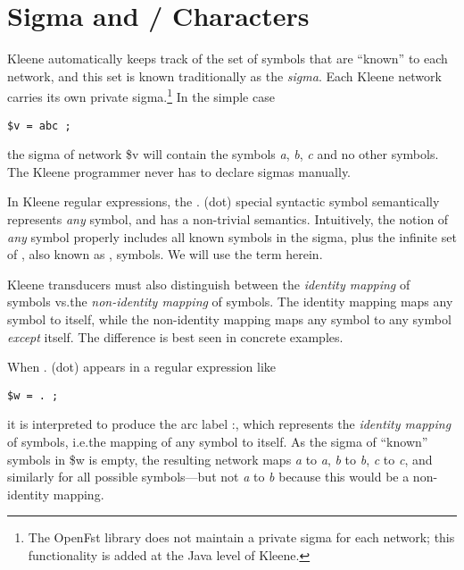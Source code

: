\chapter{Sigma and / Characters}

\label{app:other}

Kleene automatically keeps track of the set of symbols that are ``known''
to each network, and this set is known traditionally as the \emph{sigma}.
Each Kleene network carries its own private sigma.\footnote{The OpenFst
library does not maintain a private sigma for each network; this
functionality is added at the Java level of Kleene.} In the simple case 

\begin{Verbatim}[fontsize=\small]
$v = abc ;
\end{Verbatim}

\noindent
the sigma of network \$v will contain the symbols \emph{a}, \emph{b},
\emph{c} and no other symbols.  The Kleene programmer never has to
declare sigmas manually.

In Kleene regular expressions, the . (dot) special syntactic symbol
semantically represents \emph{any} symbol, and has a non-trivial
semantics.  Intuitively, the notion of \emph{any} symbol properly
includes all known symbols in the sigma, plus the infinite set of
, also known as , symbols.  We will use the
term  herein. 

Kleene transducers must also distinguish between the \emph{identity
mapping} of  symbols vs.\@ the \emph{non-identity mapping} of
 symbols.  The identity mapping maps any  symbol
to itself, while the non-identity mapping maps any  symbol to
any  symbol \emph{except} itself.  The difference is best
seen in concrete examples.


When . (dot) appears in a regular expression like

\begin{Verbatim}[fontsize=\small]
$w = . ;
\end{Verbatim}

\noindent
it is interpreted to produce the arc label
:, which represents the \emph{identity
mapping} of  symbols, i.e.\@ the mapping of any 
symbol to itself.  As the sigma of ``known'' symbols in \$w is empty, the
resulting network maps \emph{a} to \emph{a}, \emph{b} to \emph{b},
\emph{c} to \emph{c}, and similarly for all possible symbols---but not
\emph{a} to \emph{b} because this would be a non-identity mapping.

